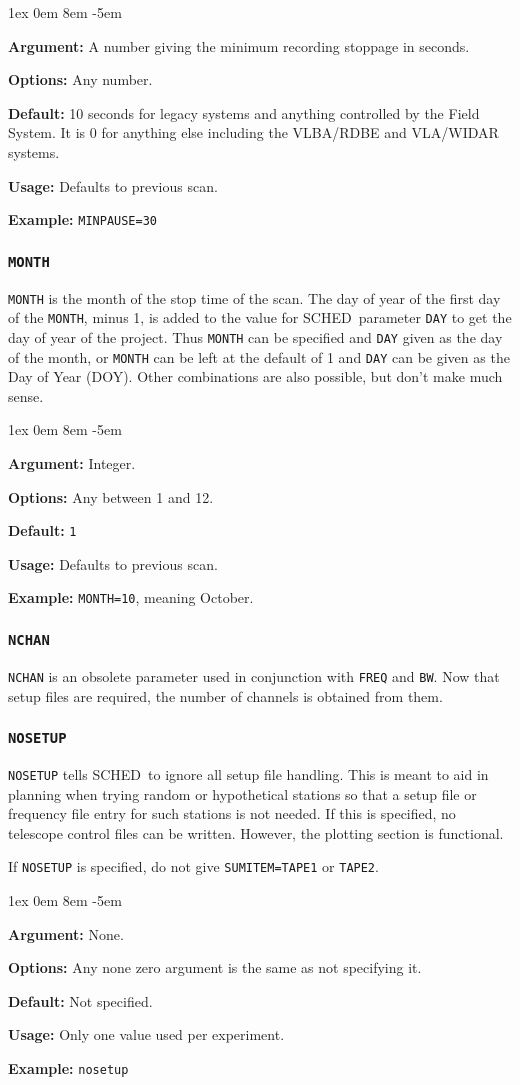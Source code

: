 \documentclass{report}
\newcommand{\schedb}{{\sc SCHED~}}
\newcommand{\rcwbox}[5]{
  \begin{list}{}{\parsep 1ex  \itemsep 0em
                 \leftmargin 8em  \itemindent -5em }
    \item {\bf Argument:} #1
    \item {\bf Options:}  #2
    \item {\bf Default:}  #3
    \item {\bf Usage:}    #4
    \item {\bf Example:}  #5
  \end{list}
}
\begin{document}
\rcwbox
{A number giving the minimum recording stoppage in seconds.}
{Any number.}
{10 seconds for legacy systems and anything controlled by the
Field System. It is 0 for anything else including the VLBA/RDBE 
and VLA/WIDAR systems.}
{Defaults to previous scan.}
{{\tt MINPAUSE=30}}



\subsubsection{\label{MP:MONTH}{\tt MONTH}}

{\tt MONTH} is the month of the stop time of the scan.  The day of
year of the first day of the {\tt MONTH}, minus 1, is added to the
value for \schedb parameter {\tt DAY} to get the day of year of
the project.  Thus {\tt MONTH} can be specified and {\tt DAY} given
as the day of the month, or {\tt MONTH} can be left at the default
of 1 and {\tt DAY} can be given as the Day of Year (DOY).  Other
combinations are also possible, but don't make much sense.

\rcwbox
{Integer.}
{Any between 1 and 12.}
{{\tt 1}}
{Defaults to previous scan.}
{{\tt MONTH=10}, meaning October.}


\subsubsection{\label{MP:NCHAN}{\tt NCHAN}}

{\tt NCHAN} is an obsolete parameter used in conjunction with {\tt FREQ} and
{\tt BW}.  Now that setup files are required, the number of channels is
obtained from them.

\subsubsection{\label{MP:NOSETUP}{\tt NOSETUP}}

{\tt NOSETUP} tells \schedb to ignore all setup file handling.  This
is meant to aid in planning when trying random or hypothetical
stations so that a setup file or frequency file entry for such
stations is not needed.  If this is specified, no telescope control
files can be written.  However, the plotting section is functional.

If {\tt NOSETUP} is specified, do not give {\tt SUMITEM=TAPE1} or
{\tt TAPE2}.

\rcwbox
{None.}
{Any none zero argument is the same as not specifying it.}
{Not specified.}
{Only one value used per experiment.}
{{\tt nosetup}}
\end{document}
